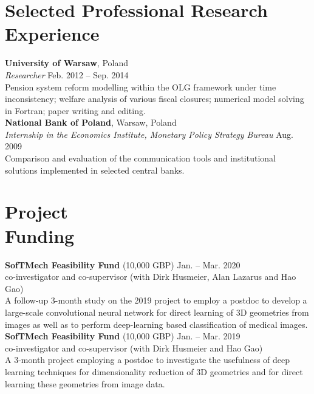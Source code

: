 \documentclass[margin,line]{resume}
\begin{document}
\begin{resume}
\newpage	

\section{\mysidestyle Selected Professional Research Experience}
\textbf{University of Warsaw}, Poland \vspace{0mm}\\
\textsl{Researcher} \hfill Feb. 2012 -- Sep. 2014\\
Pension system reform modelling within the OLG framework under time inconsistency; welfare analysis of various fiscal closures; numerical model solving in Fortran; paper writing and editing.\vspace{1.5mm} \\
\textbf{National Bank of Poland}, Warsaw, Poland \\
\textsl{Internship in the Economics Institute, Monetary Policy Strategy Bureau} \hfill Aug. 2009\\
Comparison and evaluation of the communication tools and institutional solutions implemented in selected central banks.  


\vspace{-1mm}
 

\section{\mysidestyle Project\\ Funding}	
   	\textbf{SofTMech Feasibility Fund} (10,000 GBP)	\hfill Jan. -- Mar. 2020\\
     co-investigator and co-supervisor (with Dirk Husmeier, Alan Lazarus and Hao Gao)\\
    A follow-up 3-month study on the 2019 project to employ a postdoc to develop a large-scale convolutional neural network for direct learning of 3D geometries from images as well as  to perform deep-learning based classification of medical images.  \vspace{1.5mm}\\ 
   	\textbf{SofTMech Feasibility Fund} (10,000 GBP)	\hfill Jan. -- Mar. 2019\\
     co-investigator and co-supervisor (with Dirk Husmeier and Hao Gao) \\
    A 3-month project employing a postdoc to investigate the usefulness of deep learning techniques for dimensionality reduction of 3D geometries and for direct learning these geometries from image data.
    

\end{resume}
\end{document}
